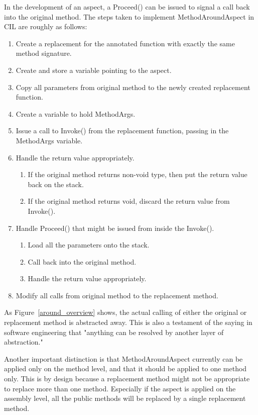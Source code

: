 In the development of an aspect, a Proceed() can be issued to signal a call back into the original method. The steps taken to implement MethodAroundAspect in CIL are roughly as follows:

\begin{enumerate}
	\item Create a replacement for the annotated function with exactly the same method signature.
	\item Create and store a variable pointing to the aspect.
	\item Copy all parameters from original method to the newly created replacement function.
	\item Create a variable to hold MethodArgs.
	\item Issue a call to Invoke() from the replacement function, passing in the MethodArgs variable.
	\item Handle the return value appropriately.
	\begin{enumerate}
		\item If the original method returns non-void type, then put the return value back on the stack.
		\item If the original method returns void, discard the return value from Invoke().
	\end{enumerate}
	\item Handle Proceed() that might be issued from inside the Invoke().
	\begin{enumerate}
		\item Load all the parameters onto the stack.
		\item Call back into the original method.
		\item Handle the return value appropriately.
	\end{enumerate}
	\item Modify all calls from original method to the replacement method.
\end{enumerate}

As Figure~\ref{around_overview} shows, the actual calling of either the original or replacement method is abstracted away. This is also a testament of the saying in software engineering that "anything can be resolved by another layer of abstraction."

Another important distinction is that MethodAroundAspect currently can be applied only on the method level, and that it should be applied to one method only. This is by design because a replacement method might not be appropriate to replace more than one method. Especially if the aspect is applied on the assembly level, all the public methods will be replaced by a single replacement method.

